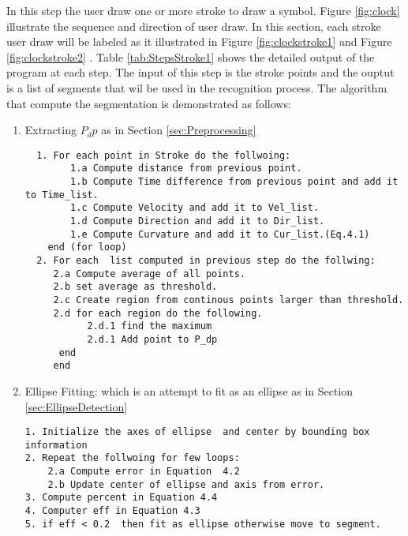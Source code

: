 In this step the user draw one or more stroke to draw a symbol. Figure \ref{fig:clock} illustrate the sequence and direction of user draw. In this section, each stroke user draw will be labeled as it illustrated in Figure \ref{fig:clockstroke1} and Figure \ref{fig:clockstroke2} . Table \ref{tab:StepsStroke1} shows the detailed output of the program at each step. The input of this step is the stroke points and the ouptut is a list of segments that wil be used in the recognition process. The algorithm that compute the segmentation is demonstrated as follows:
\begin{enumerate}

	\item Extracting $P_dp$ as in Section \ref{sec:Preprocessing}
\begin{verbatim}
  1. For each point in Stroke do the follwoing:
  		1.a Compute distance from previous point.
  		1.b Compute Time difference from previous point and add it to Time_list.  
  		1.c Compute Velocity and add it to Vel_list. 
  		1.d Compute Direction and add it to Dir_list.
  	 	1.e Compute Curvature and add it to Cur_list.(Eq.4.1) 
  	end (for loop)
  2. For each  list computed in previous step do the follwing:   
  	 2.a Compute average of all points. 
  	 2.b set average as threshold.  
  	 2.c Create region from continous points larger than threshold. 
  	 2.d for each region do the following. 
  	 	   2.d.1 find the maximum 
  	 	   2.d.1 Add point to P_dp 
  	  end
     end 
\end{verbatim}	
\item Ellipse Fitting: which is an attempt to fit as an ellipse as in  Section \ref{sec:EllipseDetection} 
\begin{verbatim}
1. Initialize the axes of ellipse  and center by bounding box information
2. Repeat the follwoing for few loops: 
	2.a Compute error in Equation  4.2 
	2.b Update center of ellipse and axis from error. 
3. Compute percent in Equation 4.4 
4. Computer eff in Equation 4.3 
5. if eff < 0.2  then fit as ellipse otherwise move to segment. 
\end{verbatim}	


\end{enumerate}
